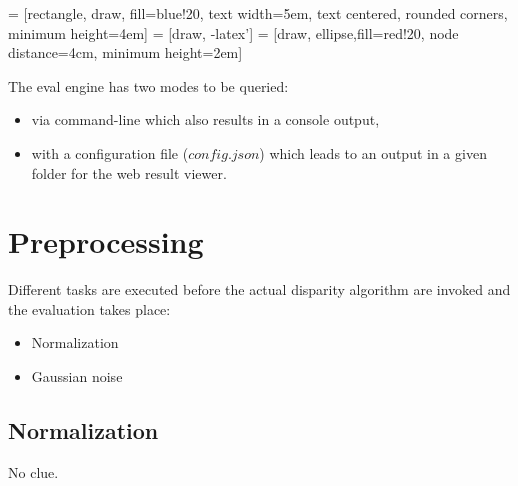  = [rectangle, draw, fill=blue!20,
    text width=5em, text centered, rounded corners, minimum height=4em]
 = [draw, -latex']
 = [draw, ellipse,fill=red!20, node distance=4cm,
    minimum height=2em]

\begin{center}
\end{center}

The eval engine has two modes to be queried:

\begin{itemize}
  \item via command-line which also results in a console output,
  \item with a configuration file ($config.json$) which leads to an output in a given folder for the web result viewer.
\end{itemize}

\section{Preprocessing}

Different tasks are executed before the actual disparity algorithm are invoked and the evaluation takes place:

\begin{itemize}
  \item Normalization
  \item Gaussian noise
\end{itemize}

\subsection*{Normalization}

No clue.

